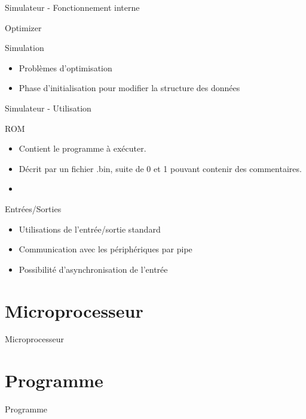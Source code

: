 \documentclass{beamer}
\begin{document}
\begin{frame}{Simulateur - Fonctionnement interne}
	\begin{block}{Optimizer}
	\end{block}
	
	\pause
	
	\begin{block}{Simulation}
		\begin{itemize}
			\item Problèmes d'optimisation
			\item Phase d'initialisation pour modifier la structure des données
		\end{itemize}
	\end{block}
\end{frame}

\begin{frame}{Simulateur - Utilisation}
	\begin{block}{ROM}
		\begin{itemize}
			\item Contient le programme à exécuter.
			\item Décrit par un fichier .bin, suite de 0 et 1 pouvant contenir des commentaires.
			\item 
		\end{itemize}
	\end{block}
	
	\pause
	
	\begin{block}{Entrées/Sorties}
		\begin{itemize}
			\item Utilisations de l'entrée/sortie standard
			\item Communication avec les périphériques par pipe
			\item Possibilité d'asynchronisation de l'entrée
		\end{itemize}
	\end{block}

\end{frame}



\section{Microprocesseur}
\begin{frame}{Microprocesseur}
	
\end{frame}


\section{Programme}
\begin{frame}{Programme}
	
\end{frame}
\end{document}
